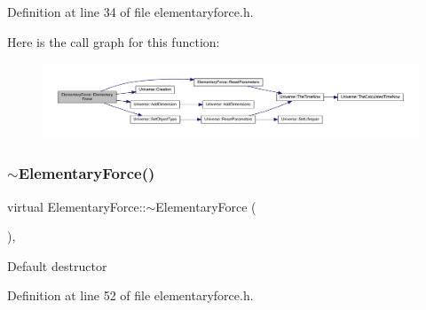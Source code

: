 Definition at line 34 of file elementaryforce.\+h.

Here is the call graph for this function\+:
\nopagebreak
\begin{figure}[H]
\begin{center}
\leavevmode
\includegraphics[width=350pt]{class_elementary_force_a1b466cc9aeb317161a7632cb5651a537_cgraph}
\end{center}
\end{figure}
\mbox{\label{class_elementary_force_afee0c87be3bd2a5221c9fcaddd70dfa6}} 
\subsubsection{\texorpdfstring{$\sim$\+Elementary\+Force()}{~ElementaryForce()}}
{\footnotesize\ttfamily virtual Elementary\+Force\+::$\sim$\+Elementary\+Force (\begin{DoxyParamCaption}{ }\end{DoxyParamCaption})\hspace{0.3cm}{\ttfamily [inline]}, {\ttfamily [virtual]}}

Default destructor 

Definition at line 52 of file elementaryforce.\+h.

